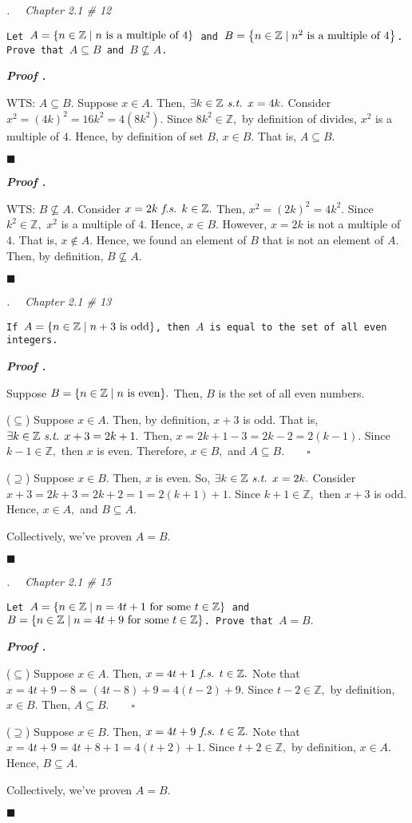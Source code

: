 \documentclass[11pt,letter]{article}
\newcounter{nq}[section]
\newcounter{np}[section]
\newenvironment*{p}{\par\noindent\textbf{\textit{Proof \stepcounter{np}\thenp. }}\par}{\par\hfill $\blacksquare$\par}
\newenvironment*{q}[1]{\noindent\emph{\thesection.\stepcounter{nq}\thenq$\quad $ #1}\par\noindent\texttt}{}
\def\Z{{\mathbb{Z}}}
\def\st{\emph{ s.t. }}
\def\fs{\emph{ f.s. }}
\begin{document}
\begin{framed}\begin{q}
	{Chapter 2.1 \# 12}
	{Let $A=\qty{n\in\Z\mid n\text{ is a multiple of }4}$ and $B=\qty{n\in\Z\mid n^2\text{ is a multiple of }4}$. Prove that $A\subseteq B$ and $B\nsubseteq A$.}
\end{q}\end{framed}
\begin{p}
	WTS: $A\subseteq B.$ Suppose $x\in A$. Then, $\exists k\in\Z\st x=4k.$ Consider $x^2=(4k)^2=16k^2=4(8k^2).$ Since $8k^2\in\Z,$ by definition of divides, $x^2$ is a multiple of $4$. Hence, by definition of set $B$, $x\in B.$ That is, $A\subseteq B.$	
\end{p}

\begin{p}
	WTS: $B\nsubseteq A.$ Consider $x=2k\fs k\in\Z.$ Then, $x^2=(2k)^2=4k^2.$ Since $k^2\in\Z,$ $x^2$ is a multiple of $4$. Hence, $x\in B.$ However, $x=2k$ is not a multiple of $4$. That is, $x\notin A.$ Hence, we found an element of $B$ that is not an element of $A$. Then, by definition, $B\nsubseteq A.$
\end{p}

\begin{framed}\begin{q}
	{Chapter 2.1 \# 13}
	{If $A=\qty{n\in\Z\mid n+3\text{ is odd}}$, then $A$ is equal to the set of all even integers.}
\end{q}\end{framed}
\begin{p}
	Suppose $B=\qty{n\in\Z\mid n\text{ is even}}.$ Then, $B$ is the set of all even numbers. \par 
	($\subseteq$) Suppose $x\in A.$ Then, by definition, $x+3$ is odd. That is, $\exists k\in\Z\st x+3=2k+1.$ Then, $x=2k+1-3=2k-2=2(k-1).$ Since $k-1\in\Z,$ then $x$ is even. Therefore, $x\in B,$ and $A\subseteq B.\qquad\square$\par 
	($\supseteq$) Suppose $x\in B.$ Then, $x$ is even. So, $\exists k\in\Z\st x=2k.$ Consider $x+3=2k+3=2k+2=1=2(k+1)+1.$ Since $k+1\in\Z,$ then $x+3$ is odd. Hence, $x\in A,$ and $B\subseteq A.$\par 
	Collectively, we've proven $A=B.$
\end{p}

\begin{framed}\begin{q}
	{Chapter 2.1 \# 15}
	{Let $A=\qty{n\in\Z\mid n=4t+1\text{ for some }t\in\Z}$ and $B=\qty{n\in\Z\mid n=4t+9\text{ for some }t\in\Z}$. Prove that $A=B.$}
\end{q}\end{framed}
\begin{p}
	($\subseteq$) Suppose $x\in A.$ Then, $x=4t+1\fs t\in\Z.$ Note that $x=4t+9-8=(4t-8)+9=4(t-2)+9.$ Since $t-2\in\Z,$ by definition, $x\in B.$ Then, $A\subseteq B.\qquad\square$\par 
	($\supseteq$) Suppose $x\in B.$ Then, $x=4t+9\fs t\in\Z.$ Note that $x=4t+9=4t+8+1=4(t+2)+1.$ Since $t+2\in\Z,$ by definition, $x\in A.$ Hence, $B\subseteq A.$\par 
	Collectively, we've proven $A=B.$
\end{p}
\end{document}
